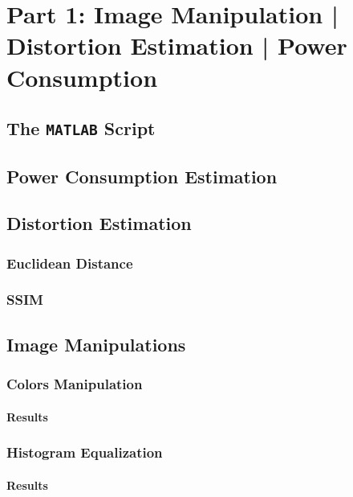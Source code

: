 \documentclass[a4paper]{article}
\begin{document}
%
\section{Part 1: Image Manipulation | Distortion Estimation | Power Consumption}

    \subsection{The \texttt{MATLAB} Script}

    \subsection{Power Consumption Estimation}

    \subsection{Distortion Estimation}

        \subsubsection{Euclidean Distance}

        \subsubsection{SSIM}

    \subsection{Image Manipulations}
        \subsubsection{Colors Manipulation}
            \paragraph{Results}
        \subsubsection{Histogram Equalization}
            \paragraph{Results}
\end{document}
